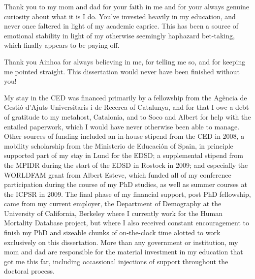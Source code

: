 Thank you to my mom and dad for your faith in me and for your always genuine
curiosity about what it is I do. You've invested heavily in my education, and never once
faltered in light of my academic caprice. This has been a source of emotional
stability in light of my otherwise seemingly haphazard bet-taking, which finally
appears to be paying off.

Thank you Ainhoa for always believing in me, for telling me so, and for keeping
me pointed straight. This dissertation would never have been finished without
you!

My stay in the CED was financed primarily by a
fellowship from the Ag\`{e}ncia de Gesti\'{o} d'Ajuts Universitaris i de Recerca
of Catalunya, and for that I owe a debt of gratitude to my metahost, Catalonia,
and to Soco and Albert for help with the entailed paperwork, which I
would have never otherwise been able to manage. Other sources of funding
included an in-house stipend from the CED in 2008, a mobility scholarship 
from the Ministerio de Educaci\'{o}n of Spain, in principle supported 
part of my stay in Lund for the EDSD; a supplemental stipend from the
MPIDR during the start of the EDSD in Rostock in 2009; and especially the
WORLDFAM grant from Albert Esteve, which funded all of my conference
participation during the course of my PhD studies, as well as summer courses at
the ICPSR in 2009. The final phase of my financial support, post PhD fellowship,
came from my current employer, the Department of Demography at the University 
of California, Berkeley where I currently work for the Human Mortality Database
project, but where I also received constant encouragement to finish my PhD and
sizeable chunks of on-the-clock time alotted to work exclusively on this
dissertation. More than any government or institution, my mom
and dad are responsible for the material investment in my education that got me this far,
including occassional injections of support throughout the doctoral process.






